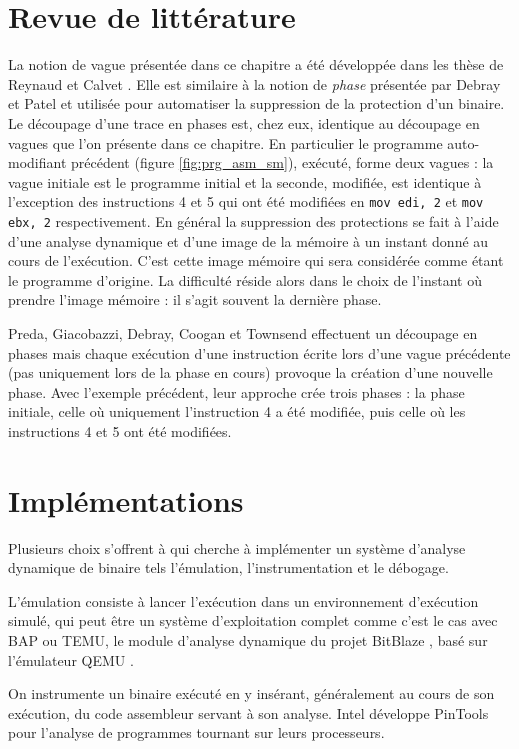 \section{Revue de littérature}
La notion de vague présentée dans ce chapitre a été développée dans les thèse de Reynaud \cite{Reynaud2010} et Calvet \cite{Calvet2013}.
Elle est similaire à la notion de \emph{phase} présentée par Debray et Patel \cite{DP10} et utilisée pour automatiser la suppression de la protection d'un binaire. Le découpage d'une trace en phases est, chez eux, identique au découpage en vagues que l'on présente dans ce chapitre.
En particulier le programme auto-modifiant précédent (figure \ref{fig:prg_asm_sm}), exécuté, forme deux vagues : la vague initiale est le programme initial et la seconde, modifiée, est identique à l'exception des instructions 4 et 5 qui ont été modifiées en \texttt{mov edi, 2} et \texttt{mov ebx, 2} respectivement.
En général la suppression des protections se fait à l'aide d'une analyse dynamique et d'une image de la mémoire à un instant donné au cours de l'exécution. C'est cette image mémoire qui sera considérée comme étant le programme d'origine. La difficulté réside alors dans le choix de l'instant où prendre l'image mémoire : il s'agit souvent la dernière phase.

Preda, Giacobazzi, Debray, Coogan et Townsend \cite{PGDCT10} effectuent un découpage en phases mais chaque exécution d'une instruction écrite lors d'une vague précédente (pas uniquement lors de la phase en cours) provoque la création d'une nouvelle phase.
Avec l'exemple précédent, leur approche crée trois phases : la phase initiale, celle où uniquement l'instruction 4 a été modifiée, puis celle où les instructions 4 et 5 ont été modifiées.

\section{Implémentations}
Plusieurs choix s'offrent à qui cherche à implémenter un système d'analyse dynamique de binaire tels l'émulation, l'instrumentation et le débogage.

L'émulation consiste à lancer l'exécution dans un environnement d'exécution simulé, qui peut être un système d'exploitation complet comme c'est le cas avec BAP ou TEMU, le module d'analyse dynamique du projet BitBlaze \cite{bitblaze08}, basé sur l'émulateur QEMU \cite{QEMU05}.

On instrumente un binaire exécuté en y insérant, généralement au cours de son exécution, du code assembleur servant à son analyse. Intel développe PinTools \cite{pintools} pour l'analyse de programmes tournant sur leurs processeurs.

